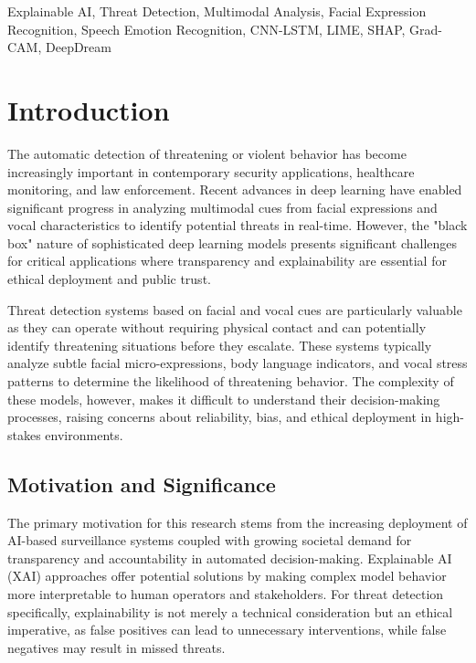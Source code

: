 \documentclass[conference,compsoc]{IEEEtran}
\begin{document}
\begin{IEEEkeywords}
Explainable AI, Threat Detection, Multimodal Analysis, Facial Expression Recognition, Speech Emotion Recognition, CNN-LSTM, LIME, SHAP, Grad-CAM, DeepDream
\end{IEEEkeywords}

\section{Introduction}
The automatic detection of threatening or violent behavior has become increasingly important in contemporary security applications, healthcare monitoring, and law enforcement. Recent advances in deep learning have enabled significant progress in analyzing multimodal cues from facial expressions and vocal characteristics to identify potential threats in real-time. However, the "black box" nature of sophisticated deep learning models presents significant challenges for critical applications where transparency and explainability are essential for ethical deployment and public trust.

Threat detection systems based on facial and vocal cues are particularly valuable as they can operate without requiring physical contact and can potentially identify threatening situations before they escalate. These systems typically analyze subtle facial micro-expressions, body language indicators, and vocal stress patterns to determine the likelihood of threatening behavior. The complexity of these models, however, makes it difficult to understand their decision-making processes, raising concerns about reliability, bias, and ethical deployment in high-stakes environments.

\subsection{Motivation and Significance}
The primary motivation for this research stems from the increasing deployment of AI-based surveillance systems coupled with growing societal demand for transparency and accountability in automated decision-making. Explainable AI (XAI) approaches offer potential solutions by making complex model behavior more interpretable to human operators and stakeholders. For threat detection specifically, explainability is not merely a technical consideration but an ethical imperative, as false positives can lead to unnecessary interventions, while false negatives may result in missed threats.
\end{document}
